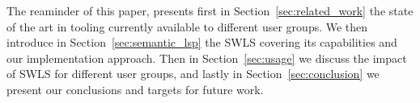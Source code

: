 The reaminder of this paper, presents first in Section~\ref{sec:related_work} the state of the art in tooling currently available to different user groups.
We then introduce in Section~\ref{sec:semantic_lsp} the SWLS covering its capabilities and our implementation approach.
Then in Section~\ref{sec:usage} we discuss the impact of SWLS for different user groups,
and lastly in Section~\ref{sec:conclusion} we present our conclusions and targets for future work.

